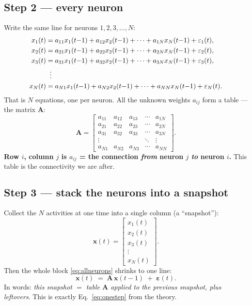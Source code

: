 \documentclass[11pt,a4paper]{article}
\newcommand{\xx}{\mathbf{x}}
\newcommand{\Amat}{\mathbf{A}}
\newcommand{\eps}{\boldsymbol{\varepsilon}}
\begin{document}
\subsection{Step 2 --- every neuron}
Write the same line for neurons $1,2,3,\dots,N$:
\begin{align}
x_1(t) &= a_{11}x_1(t{-}1) + a_{12}x_2(t{-}1) + \cdots + a_{1N}x_N(t{-}1) + \varepsilon_1(t),\notag\\
x_2(t) &= a_{21}x_1(t{-}1) + a_{22}x_2(t{-}1) + \cdots + a_{2N}x_N(t{-}1) + \varepsilon_2(t),\notag\\
x_3(t) &= a_{31}x_1(t{-}1) + a_{32}x_2(t{-}1) + \cdots + a_{3N}x_N(t{-}1) + \varepsilon_3(t),\notag\\
       &\;\;\vdots\notag\\
x_N(t) &= a_{N1}x_1(t{-}1) + a_{N2}x_2(t{-}1) + \cdots + a_{NN}x_N(t{-}1) + \varepsilon_N(t).
\label{eq:allneurons}
\end{align}
That is $N$ equations, one per neuron. All the unknown weights $a_{ij}$ form a
table --- the matrix $\Amat$:
\begin{equation}
\Amat=\begin{bmatrix}
a_{11} & a_{12} & a_{13} & \cdots & a_{1N}\\
a_{21} & a_{22} & a_{23} & \cdots & a_{2N}\\
a_{31} & a_{32} & a_{33} & \cdots & a_{3N}\\
\vdots & & & \ddots & \vdots\\
a_{N1} & a_{N2} & a_{N3} & \cdots & a_{NN}
\end{bmatrix}.
\end{equation}
\textbf{Row $i$, column $j$ is $a_{ij}$ = the connection \emph{from} neuron $j$
\emph{to} neuron $i$.} This table is the connectivity we are after.

\subsection{Step 3 --- stack the neurons into a snapshot}
Collect the $N$ activities at one time into a single column (a ``snapshot''):
\[
\xx(t)=\begin{bmatrix}x_1(t)\\ x_2(t)\\ x_3(t)\\ \vdots\\ x_N(t)\end{bmatrix}.
\]
Then the whole block \eqref{eq:allneurons} shrinks to one line:
\begin{equation}
\xx(t) \;=\; \Amat\,\xx(t{-}1) \;+\; \eps(t).
\label{eq:vector}
\end{equation}
In words: \emph{this snapshot $=$ table $\Amat$ applied to the previous snapshot,
plus leftovers}. This is exactly Eq.~\eqref{eq:onestep} from the theory.
\end{document}
